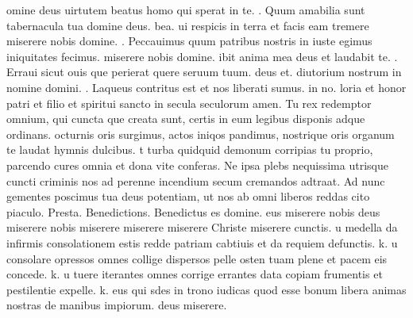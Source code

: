 \documentclass[letter,12pt]{book}
\makeatletter
\newcommand*\zallmancaps{\usefont{U}{Zallman}{xl}{n}}
\DeclareRobustCommand{\Vbar}{\vers@resp{-0.1em}{V}}
\newcommand{\vers@resp@sym}{\raisebox{0.2ex}{\rotatebox[origin=c]{-20}{$\m@th\rceil$}}}
\newcommand{\vers@resp}[2]{%
  {\ooalign{\hidewidth\kern#1\vers@resp@sym\hidewidth\cr#2\cr}}%
}%
\def\V{\color{Red} \Vbar . \color{black}}
\makeatother
\begin{document}
\par {}omine deus uirtutem beatus homo qui sperat in te. \V Quum amabilia sunt tabernacula tua domine deus. bea.
ui respicis in terra et facis eam tremere miserere nobis domine. \V Peccauimus quum patribus nostris in iuste egimus iniquitates fecimus. miserere nobis domine.
ibit anima mea deus et laudabit te. \V Erraui sicut ouis que perierat quere seruum tuum. deus et.
diutorium nostrum in nomine domini.
\V Laqueus contritus est et nos liberati sumus. in no.
loria et honor patri et filio et spiritui sancto in secula seculorum amen.
\lettrine[lines=4]{\color{Red} \zallmancaps T}{}u rex redemptor omnium,
qui cuncta que creata sunt,
certis in eum legibus
disponis adque ordinans.
octurnis oris surgimus,
actos iniqos pandimus,
nostrique oris organum
te laudat hymnis dulcibus.
t turba quidquid demonum
corripias tu proprio,
parcendo cures omnia
et dona vite conferas.
{\color{Red} N}e ipsa plebs nequissima
utrisque cuncti criminis
nos ad perenne incendium
secum cremandos adtraat.
{\color{Red} A}d nunc gementes poscimus
tua deus potentiam,
ut nos ab omni liberos
reddas cito piaculo. {\color{Red} P}resta. {\color{Red} Benedictions. B}enedictus es domine.
eus miserere nobis deus miserere nobis miserere miserere miserere Christe miserere cunctis.
u medella da infirmis consolationem estis redde patriam cabtiuis et da requiem defunctis. {\color{Red} k.}
u consolare opressos omnes collige dispersos pelle osten tuam plene et pacem eis concede. {\color{Red} k.}
u tuere iterantes omnes corrige errantes data copiam frumentis et pestilentie expelle. {\color{Red} k.}
eus qui sdes in trono iudicas quod esse bonum libera animas nostras de manibus impiorum. deus miserere.
\end{document}
